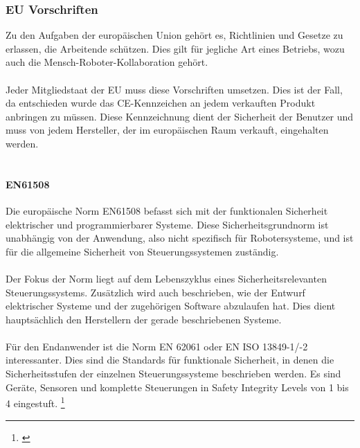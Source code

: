\documentclass[titlepage,12pt,twoside]{article}
\begin{document}
\subsubsection{EU Vorschriften}
Zu den Aufgaben der europäischen Union gehört es, Richtlinien und Gesetze zu 
erlassen, die Arbeitende schützen. Dies gilt für jegliche Art eines Betriebs, 
wozu auch die Mensch-Roboter-Kollaboration gehört. \\
\\
Jeder Mitgliedstaat der EU muss diese Vorschriften umsetzen. Dies ist der Fall, 
da entschieden wurde das CE-Kennzeichen an jedem verkauften Produkt anbringen zu 
müssen. Diese Kennzeichnung dient der Sicherheit der Benutzer und muss von jedem 
Hersteller, der im europäischen Raum verkauft, eingehalten werden. \\
\\
\paragraph{EN61508}
\hfill \break
\hfill \break
Die europäische Norm EN61508 befasst sich mit der funktionalen Sicherheit 
elektrischer und programmierbarer Systeme. Diese Sicherheitsgrundnorm ist 
unabhängig von der Anwendung, also nicht spezifisch für Robotersysteme, und ist 
für die allgemeine Sicherheit von Steuerungssystemen zuständig. \\
\\
Der Fokus der Norm liegt auf dem Lebenszyklus eines Sicherheitsrelevanten 
Steuerungssystems. Zusätzlich wird auch beschrieben, wie der Entwurf elektrischer 
Systeme und der zugehörigen Software abzulaufen hat. Dies dient hauptsächlich den 
Herstellern der gerade beschriebenen Systeme. \\
\\
Für den Endanwender ist die Norm EN 62061 oder EN ISO 13849-1/-2 interessanter. 
Dies sind die Standards für funktionale Sicherheit, in denen die Sicherheitsstufen 
der einzelnen Steuerungssysteme beschrieben werden. Es sind Geräte, Sensoren und 
komplette Steuerungen in Safety Integrity Levels von 1 bis 4 eingestuft. \footnote{\cite{Pilz}}\\
\newpage
\end{document}
